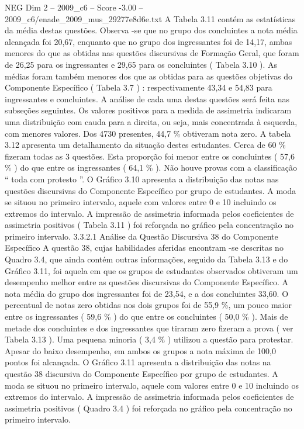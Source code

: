\begin{textsample}{NEG Dim 2 – 2009\_c6 – Score -3.00 – 2009\_c6/enade\_2009\_mus\_29277e8d6e.txt}
A Tabela 3.11 contém as estatísticas da média destas questões.
Observa -se que no grupo dos concluintes a nota média alcançada foi 20,67, enquanto que no grupo dos ingressantes foi de 14,17, ambas menores do que as obtidas nas questões discursivas de Formação Geral, que foram de 26,25 para os ingressantes e 29,65 para os concluintes ( Tabela 3.10 ).
As médias foram também menores dos que as obtidas para as questões objetivas do Componente Específico ( Tabela 3.7 ) : respectivamente 43,34 e 54,83 para ingressantes e concluintes.
A análise de cada uma destas questões será feita nas subseções seguintes.
Os valores positivos para a medida de assimetria indicaram uma distribuição com cauda para a direita, ou seja, mais concentrada à esquerda, com menores valores.
Dos 4730 presentes, 44,7 \% obtiveram nota zero.
A tabela 3.12 apresenta um detalhamento da situação destes estudantes.
Cerca de 60 \% fizeram todas as 3 questões.
Esta proporção foi menor entre os concluintes ( 57,6 \% ) do que entre os ingressantes ( 64,1 \% ).
Não houve provas com a classificação “ toda com protesto ”.
O Gráfico 3.10 apresenta a distribuição das notas nas questões discursivas do Componente Específico por grupo de estudantes.
A moda se situou no primeiro intervalo, aquele com valores entre 0 e 10 incluindo os extremos do intervalo.
A impressão de assimetria informada pelos coeficientes de assimetria positivos ( Tabela 3.11 ) foi reforçada no gráfico pela concentração no primeiro intervalo. 3.3.2.1 Análise da Questão Discursiva 38 do Componente Específico A questão 38, cujas habilidades aferidas encontram -se descritas no Quadro 3.4, que ainda contém outras informações, seguido da Tabela 3.13 e do Gráfico 3.11, foi aquela em que os grupos de estudantes observados obtiveram um desempenho melhor entre as questões discursivas do Componente Específico.
A nota média do grupo dos ingressantes foi de 23,54, e a dos concluintes 33,60.
O percentual de notas zero obtidas nos dois grupos foi de 55,9 \%, um pouco maior entre os ingressantes ( 59,6 \% ) do que entre os concluintes ( 50,0 \% ).
Mais de metade dos concluintes e dos ingressantes que tiraram zero fizeram a prova ( ver Tabela 3.13 ).
Uma pequena minoria ( 3,4 \% ) utilizou a questão para protestar.
Apesar do baixo desempenho, em ambos os grupos a nota máxima de 100,0 pontos foi alcançada.
O Gráfico 3.11 apresenta a distribuição das notas na questão 38 discursiva do Componente Específico por grupo de estudantes.
A moda se situou no primeiro intervalo, aquele com valores entre 0 e 10 incluindo os extremos do intervalo.
A impressão de assimetria informada pelos coeficientes de assimetria positivos ( Quadro 3.4 ) foi reforçada no gráfico pela concentração no primeiro intervalo.

\end{textsample}
